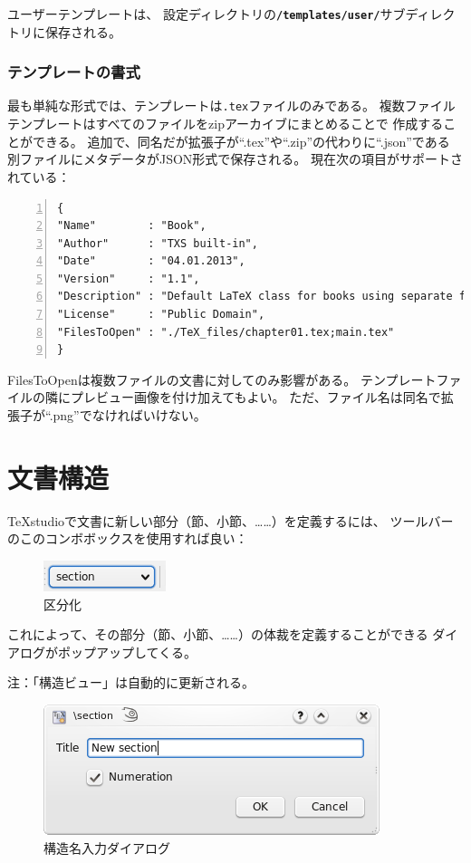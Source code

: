 ユーザーテンプレートは、
設定ディレクトリの\textbf{\texttt{/templates/user/}}サブディレクトリに保存される。

\subsubsection{テンプレートの書式}\label{sec:templateformat}

最も単純な形式では、テンプレートは\texttt{.tex}ファイルのみである。
複数ファイルテンプレートはすべてのファイルをzipアーカイブにまとめることで
作成することができる。
追加で、同名だが拡張子が``.tex''や``.zip''の代わりに``.json''である
別ファイルにメタデータがJSON形式で保存される。
現在次の項目がサポートされている：

\begin{lstlisting}[frame=single,breaklines=true,numbers=left]
{
"Name"        : "Book",
"Author"      : "TXS built-in",
"Date"        : "04.01.2013",
"Version"     : "1.1",
"Description" : "Default LaTeX class for books using separate files for each chapter.",
"License"     : "Public Domain",
"FilesToOpen" : "./TeX_files/chapter01.tex;main.tex"
}
\end{lstlisting}

FilesToOpenは複数ファイルの文書に対してのみ影響がある。
テンプレートファイルの隣にプレビュー画像を付け加えてもよい。
ただ、ファイル名は同名で拡張子が``.png''でなければいけない。

\section{文書構造}

TeXstudioで文書に新しい部分（節、小節、……）を定義するには、
ツールバーのこのコンボボックスを使用すれば良い：

\begin{figure}[H]
  \centering
  \includegraphics{doc3.png}
  \caption{区分化}
\end{figure}

これによって、その部分（節、小節、……）の体裁を定義することができる
ダイアログがポップアップしてくる。

注：「構造ビュー」は自動的に更新される。

\begin{figure}[H]
  \centering
  \includegraphics{doc4.png}
  \caption{構造名入力ダイアログ}
\end{figure}

